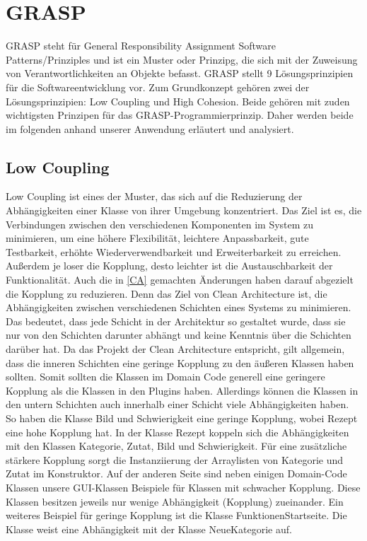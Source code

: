 \section{GRASP}
GRASP steht für General Responsibility Assignment Software Patterns/Prinziples und ist ein Muster oder Prinzipg, die sich mit der Zuweisung von Verantwortlichkeiten an Objekte befasst. GRASP stellt 9 Lösungsprinzipien für die Softwareentwicklung vor. Zum Grundkonzept gehören zwei der Lösungsprinzipien: Low Coupling und High Cohesion. Beide gehören mit zuden wichtigsten Prinzipen für das GRASP-Programmierprinzip. Daher werden beide im folgenden anhand unserer Anwendung erläutert und analysiert.

\subsection{Low Coupling}
Low Coupling ist eines der Muster, das sich auf die Reduzierung der Abhängigkeiten einer Klasse von ihrer Umgebung konzentriert. Das Ziel ist es, die Verbindungen zwischen den verschiedenen Komponenten im System zu minimieren, um eine höhere Flexibilität, leichtere Anpassbarkeit, gute Testbarkeit, erhöhte Wiederverwendbarkeit und Erweiterbarkeit zu erreichen. Außerdem je loser die Kopplung, desto leichter ist die Austauschbarkeit der Funktionalität.
Auch die in \autoref{CA} gemachten Änderungen haben darauf abgezielt die Kopplung zu reduzieren. Denn das Ziel von Clean Architecture ist, die Abhängigkeiten zwischen verschiedenen Schichten eines Systems zu minimieren. Das bedeutet, dass jede Schicht in der Architektur so gestaltet wurde, dass sie nur von den Schichten darunter abhängt und keine Kenntnis über die Schichten darüber hat.
Da das Projekt der Clean Architecture entspricht, gilt allgemein, dass die inneren Schichten eine geringe Kopplung zu den äußeren Klassen haben sollten. 
Somit sollten die Klassen im Domain Code generell eine geringere Kopplung als die Klassen in den Plugins haben. Allerdings können die Klassen in den untern Schichten auch innerhalb einer Schicht viele Abhängigkeiten haben. So haben die Klasse Bild und Schwierigkeit eine geringe Kopplung, wobei Rezept eine hohe Kopplung hat.  
In der Klasse Rezept koppeln sich die Abhängigkeiten mit den Klassen Kategorie, Zutat, Bild und Schwierigkeit. Für eine zusätzliche stärkere Kopplung sorgt die Instanziierung der Arraylisten
von Kategorie und Zutat im Konstruktor.
Auf der anderen Seite sind neben einigen Domain-Code Klassen unsere GUI-Klassen Beispiele für Klassen mit schwacher Kopplung. Diese Klassen besitzen jeweils nur wenige Abhängigkeit (Kopplung) zueinander. 
Ein weiteres Beispiel für geringe Kopplung ist die Klasse FunktionenStartseite. Die Klasse weist eine Abhängigkeit mit
der Klasse NeueKategorie auf.
